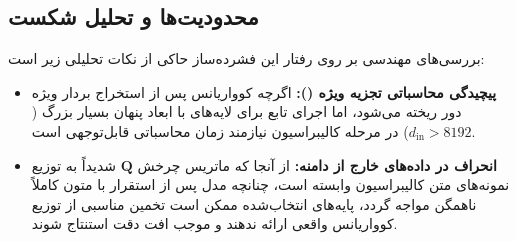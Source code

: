 \subsection{محدودیت‌ها و تحلیل شکست}
بررسی‌های مهندسی بر روی رفتار این فشرده‌ساز حاکی از نکات تحلیلی زیر است:
\begin{itemize}
    \item \textbf{پیچیدگی محاسباتی تجزیه ویژه ():} اگرچه کوواریانس پس از استخراج بردار ویژه دور ریخته می‌شود، اما اجرای تابع  برای لایه‌های با ابعاد پنهان بسیار بزرگ ($d_{\text{in}} > 8192$) در مرحله کالیبراسیون نیازمند زمان محاسباتی قابل‌توجهی است.
    \item \textbf{انحراف در داده‌های خارج از دامنه:} از آنجا که ماتریس چرخش $\mathbf{Q}$ شدیداً به توزیع نمونه‌های متن کالیبراسیون وابسته است، چنانچه مدل پس از استقرار با متون کاملاً ناهمگن مواجه گردد، پایه‌های انتخاب‌شده ممکن است تخمین مناسبی از توزیع کوواریانس واقعی ارائه ندهند و موجب افت دقت استنتاج شوند.
\end{itemize}
